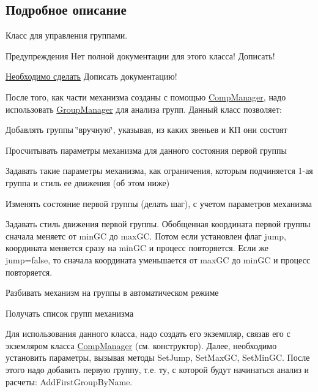 \subsection{Подробное описание}
Класс для управления группами. \begin{DoxyWarning}{Предупреждения}
Нет полной документации для этого класса! Дописать! 
\end{DoxyWarning}
\begin{Desc}
\item[\hyperlink{todo__todo000003}{Необходимо сделать}]Дописать документацию! \end{Desc}


После того, как части механизма созданы с помощью \hyperlink{class_comp_manager}{CompManager}, надо использовать \hyperlink{class_group_manager}{GroupManager} для анализа групп. Данный класс позволяет: 
\begin{DoxyItemize}
\item Добавлять группы \char`\"{}вручную\char`\"{}, указывая, из каких звеньев и КП они состоят 
\item Просчитывать параметры механизма для данного состояния первой группы 
\item Задавать такие параметры механизма, как ограничения, которым подчиняется 1-\/ая группа и стиль ее движения (об этом ниже) 
\item Изменять состояние первой группы (делать шаг), с учетом параметров механизма 
\item Задавать стиль движения первой группы. Обобщенная координата первой группы сначала меняетс от minGC до maxGC. Потом если установлен флаг jump, координата меняется сразу на minGC и процесс повторяется. Если же jump=false, то сначала координата уменьшается от maxGC до minGC и процесс повторяется. 
\item Разбивать механизм на группы в автоматическом режиме 
\item Получать список групп механизма 
\end{DoxyItemize}

Для использования данного класса, надо создать его экземпляр, связав его с экземляром класса \hyperlink{class_comp_manager}{CompManager} (см. конструктор). Далее, необходимо установить параметры, вызывая методы SetJump, SetMaxGC, SetMinGC. После этого надо добавить первую группу, т.е. ту, с которой будут начинаться анализ и расчеты: AddFirstGroupByName. 

